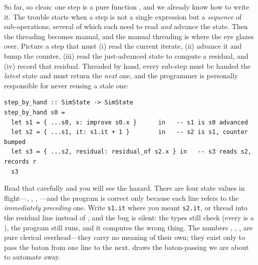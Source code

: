 \noindent So far, so clean: one step is a pure function ,
and we already know how to write it. The trouble starts when a step is not a single
expression but a \emph{sequence} of sub-operations, several of which each need to
read \emph{and} advance the state. Then the threading becomes manual, and the manual
threading is where the eye glazes over. Picture a step that must (i) read the current
iterate, (ii) advance it and bump the counter, (iii) read the just-advanced state to
compute a residual, and (iv) record that residual. Threaded by hand, every sub-step
must be handed the \emph{latest} state and must return the \emph{next} one, and the
programmer is personally responsible for never reusing a stale one:

\begin{lstlisting}[style=l4style]
step_by_hand :: SimState -> SimState
step_by_hand s0 =
  let s1 = { ...s0, x: improve s0.x }      in   -- s1 is s0 advanced
  let s2 = { ...s1, it: s1.it + 1 }        in   -- s2 is s1, counter bumped
  let s3 = { ...s2, residual: residual_of s2.x } in   -- s3 reads s2, records r
  s3
\end{lstlisting}

\noindent Read that carefully and you will see the hazard. There are four state
values in flight---, , , ---and the program is
correct only because each line refers to the \emph{immediately preceding} one. Write
\lstinline[style=l4style]|s1.it| where you meant \lstinline[style=l4style]|s2.it|,
or thread  into the residual line instead of , and the bug is
silent: the types still check (every  is a ), the program
still runs, and it computes the wrong thing. The numbers , ,
,  are pure clerical overhead---they carry no meaning of their own;
they exist only to pass the baton from one line to the next.  draws
the baton-passing we are about to automate away.

